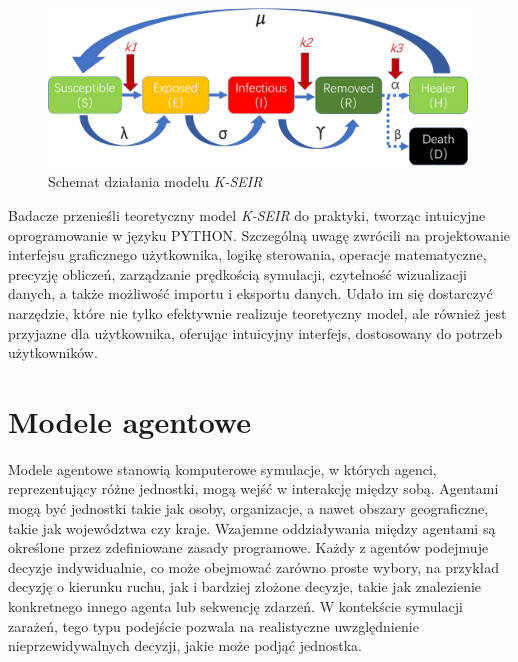 \begin{figure}[h!]
	\includegraphics[width=\linewidth]{kseirscheme.png}
	\caption{Schemat działania modelu  \textit {K-SEIR}\cite{bib:artykul} }
\end{figure}

Badacze przenieśli teoretyczny model \textit {K-SEIR} do praktyki, tworząc intuicyjne oprogramowanie w języku PYTHON. Szczególną uwagę zwrócili na projektowanie interfejsu graficznego użytkownika, logikę sterowania, operacje matematyczne, precyzję obliczeń, zarządzanie prędkością symulacji, czytelność wizualizacji danych, a także możliwość importu i eksportu danych. Udało im się dostarczyć narzędzie, które nie tylko efektywnie realizuje teoretyczny model, ale również jest przyjazne dla użytkownika, oferując intuicyjny interfejs, dostosowany do potrzeb użytkowników.
\newpage
\section{\textbf{Modele agentowe}}

Modele agentowe stanowią komputerowe symulacje, w których agenci, reprezentujący różne jednostki, mogą wejść w interakcję między sobą. Agentami mogą być jednostki takie jak osoby, organizacje, a nawet obszary geograficzne, takie jak województwa czy kraje. Wzajemne oddziaływania między agentami są określone przez zdefiniowane zasady programowe. Każdy z agentów podejmuje decyzje indywidualnie, co może obejmować zarówno proste wybory, na przykład decyzję o kierunku ruchu, jak i bardziej złożone decyzje, takie jak znalezienie konkretnego innego agenta lub sekwencję zdarzeń. W kontekście symulacji zarażeń, tego typu podejście pozwala na realistyczne uwzględnienie nieprzewidywalnych decyzji, jakie może podjąć jednostka.

